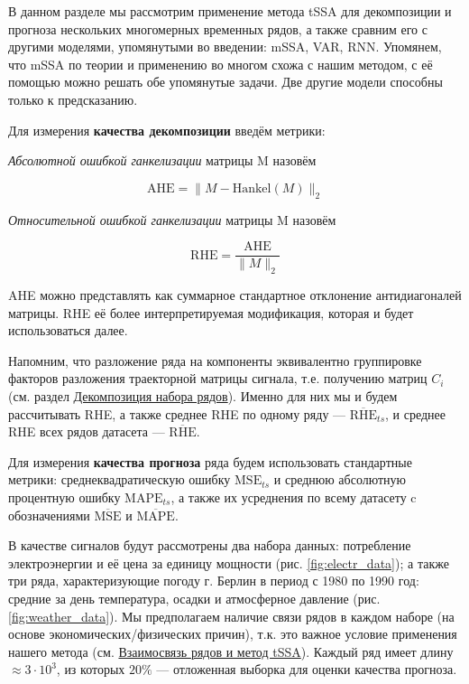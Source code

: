 			В данном разделе мы рассмотрим применение метода tSSA для декомпозиции и прогноза нескольких многомерных временных рядов, а также сравним его с другими моделями, упомянутыми во введении: mSSA, VAR, RNN. Упомянем, что mSSA по теории и применению во многом схожа с нашим методом, с её помощью можно решать обе упомянутые задачи. Две другие модели способны только к предсказанию.
		
			Для измерения \textbf{качества декомпозиции} введём метрики:
			
			\begin{Def}
				\emph{Абсолютной ошибкой ганкелизации} матрицы M назовём 
				
				\[
					\text{AHE} = \lVert M - \text{Hankel}(M) \rVert_2
				\] 
				
			\end{Def}	
			
			\begin{Def}		
				
				\emph{Относительной ошибкой ганкелизации} матрицы M назовём 
				
				\[
				\text{RHE} = \frac{\text{AHE}}{\lVert M \rVert_2} 
				\] 		
				
			\end{Def}
			
			AHE можно представлять как суммарное стандартное отклонение антидиагоналей матрицы. RHE её более интерпретируемая модификация, которая и будет использоваться далее. 
			
			Напомним, что разложение ряда на компоненты эквивалентно группировке факторов разложения траекторной матрицы сигнала, т.е. получению матриц $ C_i $ (см. раздел \hyperref[sec:decomposition]{Декомпозиция набора рядов}). Именно для них мы и будем рассчитывать RHE, а также среднее RHE по одному ряду --- $ \overline{\text{RHE}}_{ts} $, и среднее RHE всех рядов датасета --- $ \overline{\text{RHE}} $.
			
			Для измерения \textbf{качества прогноза} ряда будем использовать стандартные метрики: среднеквадратическую ошибку $ \text{MSE}_{ts} $ и среднюю абсолютную процентную ошибку $ \text{MAPE}_{ts} $, а также их усреднения по всему датасету c обозначениями $ \overline{\text{MSE}} $ и $ \overline{\text{MAPE}} $.
			
			В качестве сигналов будут рассмотрены два набора данных: потребление электроэнергии и её цена за единицу мощности (рис. \ref{fig:electr_data}); а также три ряда, характеризующие погоду г. Берлин в период с 1980 по 1990 год: средние за день температура, осадки и атмосферное давление (рис. \ref{fig:weather_data}). Мы предполагаем наличие связи рядов в каждом наборе (на основе экономических/физических причин), т.к. это важное условие применения нашего метода (см. \hyperref[sec:tssa_method]{Взаимосвязь рядов и метод tSSA}). Каждый ряд имеет длину $ \approx 3 \cdot 10^3 $, из которых $ 20\% $ --- отложенная выборка для оценки качества прогноза.
			
